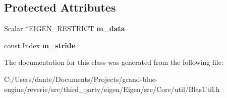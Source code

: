 \subsection*{Protected Attributes}
\begin{DoxyCompactItemize}
\item 
\mbox{\label{class_eigen_1_1internal_1_1blas__data__mapper_ae0833ea4b5bb89f042f6c582be6baf48}} 
Scalar $\ast$E\+I\+G\+E\+N\+\_\+\+R\+E\+S\+T\+R\+I\+CT {\bfseries m\+\_\+data}
\item 
\mbox{\label{class_eigen_1_1internal_1_1blas__data__mapper_a9547e7778e522ac1c4276a8dd04a959f}} 
const Index {\bfseries m\+\_\+stride}
\end{DoxyCompactItemize}


The documentation for this class was generated from the following file\+:\begin{DoxyCompactItemize}
\item 
C\+:/\+Users/dante/\+Documents/\+Projects/grand-\/blue-\/engine/reverie/src/third\+\_\+party/eigen/\+Eigen/src/\+Core/util/Blas\+Util.\+h\end{DoxyCompactItemize}
